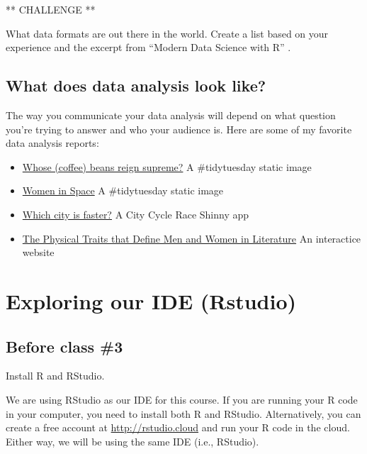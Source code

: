 \documentclass[
]{book}
\begin{document}
** CHALLENGE **

What data formats are out there in the world. Create a list based on your experience and the excerpt from ``Modern Data Science with R'' \citep{baumer2017modern}.

\hypertarget{what-does-data-analysis-look-like}{%
\section{What does data analysis look like?}\label{what-does-data-analysis-look-like}}

The way you communicate your data analysis will depend on what question you're trying to answer and who your audience is. Here are some of my favorite data analysis reports:

\begin{itemize}
\item
  \href{https://twitter.com/IsChiaThere/status/1282681472185401349/photo/1}{Whose (coffee) beans reign supreme?} A \#tidytuesday static image
\item
  \href{https://twitter.com/geokaramanis/status/1283410776913514496/photo/1}{Women in Space} A \#tidytuesday static image
\item
  \href{https://sebastianwolf.shinyapps.io/stravachaserapp/}{Which city is faster?} A City Cycle Race Shinny app
\item
  \href{https://pudding.cool/2020/07/gendered-descriptions/}{The Physical Traits that Define Men and Women in Literature} An interactice website
\end{itemize}

\hypertarget{install-r}{%
\chapter{Exploring our IDE (Rstudio)}\label{install-r}}

\hypertarget{before-class-3}{%
\section{Before class \#3}\label{before-class-3}}

Install R and RStudio.

We are using RStudio as our IDE for this course. If you are running your R code in your computer, you need to install both R and RStudio. Alternatively, you can create a free account at \url{http://rstudio.cloud} and run your R code in the cloud. Either way, we will be using the same IDE (i.e., RStudio).
\end{document}
